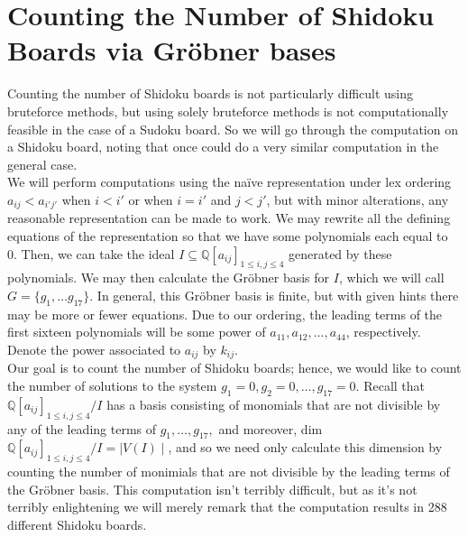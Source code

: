 \documentclass[12pt]{amsart}
\begin{document}
\section{Counting the Number of Shidoku Boards via Gr\" obner bases}
Counting the number of Shidoku boards is not particularly difficult using bruteforce methods, but using solely bruteforce methods is not computationally feasible in the case of a Sudoku board. So we will go through the computation on a Shidoku board, noting that once could do a very similar computation in the general case.\\

We will perform computations using the na\" ive representation under lex ordering $a_{ij} < a_{i'j'}$ when $i < i'$ or when $i = i'$ and $j < j'$, but with minor alterations, any reasonable representation can be made to work. We may rewrite all the defining equations of the representation so that we have some polynomials each equal to 0. Then, we can take the ideal $I\subseteq \mathbb{Q} [a_{ij}]_{1\leq i,j\leq4}$ generated by these polynomials. We may then calculate the Gr\" obner basis for $I$, which we will call $G = \{g_1,\ldots g_{17}\}.$ In general, this Gr\" obner basis is finite, but with given hints there may be more or fewer equations. Due to our ordering, the leading terms of the first sixteen polynomials will be some power of $a_{11}, a_{12}, \ldots, a_{44}$, respectively. Denote the power associated to $a_{ij}$ by $k_{ij}$.\\

Our goal is to count the number of Shidoku boards; hence, we would like to count the number of solutions to the system $g_1 = 0, g_2 = 0, \ldots, g_17 = 0.$ Recall that $\mathbb{Q} [a_{ij}]_{1\leq i,j\leq4}/I$ has a basis consisting of monomials that are not divisible by any of the leading terms of $g_1, \ldots, g_17,$ and moreover, dim $\mathbb{Q} [a_{ij}]_{1\leq i,j\leq4}/I = \mid V(I)\mid$, and so we need only calculate this dimension by counting the number of monimials that are not divisible by the leading terms of the Gr\" obner basis. This computation isn't terribly difficult, but as it's not terribly enlightening we will merely remark that the computation results in 288 different Shidoku boards.
\end{document}
